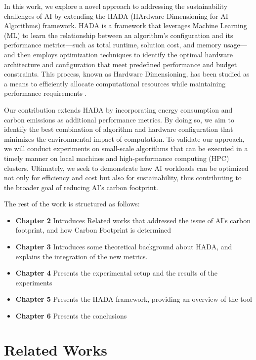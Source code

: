 \documentclass[a4paper,singleside,12pt]{report} %
\begin{document}
In this work, we explore a novel approach to addressing the sustainability challenges of AI by extending the HADA (HArdware 
Dimensioning for AI Algorithms) framework. HADA is a framework that leverages Machine Learning (ML) to learn the relationship 
between an algorithm's configuration and its performance metrics—such as total runtime, solution cost, and memory usage—and then 
employs optimization techniques to identify the optimal hardware architecture and configuration that meet predefined performance 
and budget constraints. This process, known as Hardware Dimensioning, has been studied as a means to efficiently allocate 
computational resources while maintaining performance requirements \cite{DEFILIPPO2022109199}. 

Our contribution extends HADA by incorporating energy consumption and carbon emissions as additional performance metrics. 
By doing so, we aim to identify the best combination of algorithm and hardware configuration that minimizes the environmental 
impact of computation. To validate our approach, we will conduct experiments on small-scale algorithms that can be executed in 
a timely manner on local machines and high-performance computing (HPC) clusters. Ultimately, we seek to demonstrate how AI 
workloads can be optimized not only for efficiency and cost but also for sustainability, thus contributing to the broader goal 
of reducing AI's carbon footprint.


The rest of the work is structured as follows:
\begin{itemize}
    \item \textbf{Chapter 2} Introduces Related works that addressed the issue of AI's carbon footprint, and how Carbon Footprint is determined
    \item \textbf{Chapter 3} Introduces some theoretical background about HADA, and explains the integration of the new metrics.
    \item \textbf{Chapter 4} Presents the experimental setup and the results of the experiments
    \item \textbf{Chapter 5} Presents the HADA framework, providing an overview of the tool
    \item \textbf{Chapter 6} Presents the conclusions
\end{itemize}

\chapter{Related Works}
\end{document}
